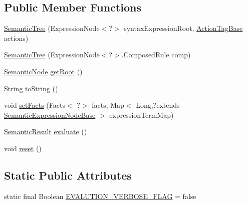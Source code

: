 \subsection*{Public Member Functions}
\begin{DoxyCompactItemize}
\item 
\hyperlink{classit_1_1emarolab_1_1cagg_1_1core_1_1evaluation_1_1semanticGrammar_1_1SemanticTree_a9f3a9d47c7abd723f505b71532d7edee}{Semantic\-Tree} (Expression\-Node$<$?$>$ syntax\-Expression\-Root, \hyperlink{classit_1_1emarolab_1_1cagg_1_1core_1_1evaluation_1_1semanticGrammar_1_1syntaxCompiler_1_1ActionTagBase}{Action\-Tag\-Base} actions)
\item 
\hyperlink{classit_1_1emarolab_1_1cagg_1_1core_1_1evaluation_1_1semanticGrammar_1_1SemanticTree_aa2198e7458fd75ab14e9f20b5528612e}{Semantic\-Tree} (Expression\-Node$<$?$>$.Composed\-Rule comp)
\item 
\hyperlink{classit_1_1emarolab_1_1cagg_1_1core_1_1evaluation_1_1semanticGrammar_1_1SemanticTree_1_1SemanticNode}{Semantic\-Node} \hyperlink{classit_1_1emarolab_1_1cagg_1_1core_1_1evaluation_1_1semanticGrammar_1_1SemanticTree_ad0039e048adb975a2d20a432520f00fb}{get\-Root} ()
\item 
String \hyperlink{classit_1_1emarolab_1_1cagg_1_1core_1_1evaluation_1_1semanticGrammar_1_1SemanticTree_af0a4cf42b343335e6cbfec6b83a69611}{to\-String} ()
\item 
void \hyperlink{classit_1_1emarolab_1_1cagg_1_1core_1_1evaluation_1_1semanticGrammar_1_1SemanticTree_afecd1f6fb5931a70554c80c4b6111b46}{set\-Facts} (Facts$<$ ?$>$ facts, Map$<$ Long,?extends \hyperlink{classit_1_1emarolab_1_1cagg_1_1core_1_1evaluation_1_1semanticGrammar_1_1syntaxCompiler_1_1Semantec1f2fc886c35d505e2bc10592e2dff6}{Semantic\-Expression\-Node\-Base} $>$ expression\-Term\-Map)
\item 
\hyperlink{classit_1_1emarolab_1_1cagg_1_1core_1_1evaluation_1_1semanticGrammar_1_1syntaxCompiler_1_1Semant5d395032261986aec1b33357dd21b6bb}{Semantic\-Result} \hyperlink{classit_1_1emarolab_1_1cagg_1_1core_1_1evaluation_1_1semanticGrammar_1_1SemanticTree_a89058ee1818e98a11097164b68a5e2bb}{evaluate} ()
\item 
void \hyperlink{classit_1_1emarolab_1_1cagg_1_1core_1_1evaluation_1_1semanticGrammar_1_1SemanticTree_a2813bf677f1c377a3d11216ce797808c}{reset} ()
\end{DoxyCompactItemize}
\subsection*{Static Public Attributes}
\begin{DoxyCompactItemize}
\item 
static final Boolean \hyperlink{classit_1_1emarolab_1_1cagg_1_1core_1_1evaluation_1_1semanticGrammar_1_1SemanticTree_ad192e6ff85756491abc491802b43702d}{E\-V\-A\-L\-U\-T\-I\-O\-N\-\_\-\-V\-E\-R\-B\-O\-S\-E\-\_\-\-F\-L\-A\-G} = false
\end{DoxyCompactItemize}
